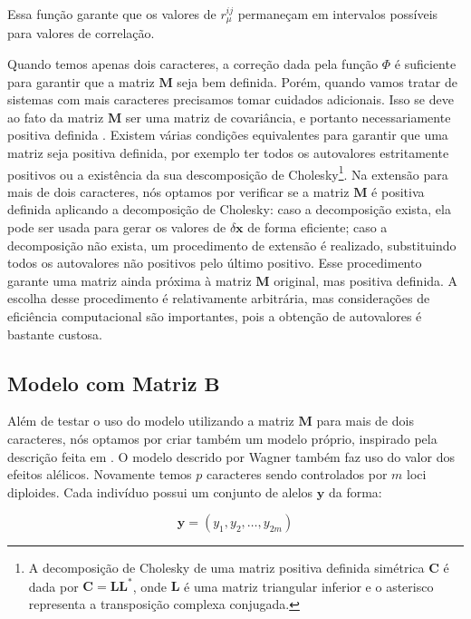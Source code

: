 Essa função garante que os valores de $r_\mu^{ij}$ permaneçam em
intervalos possíveis para valores de correlação.

Quando temos apenas dois caracteres, a correção dada pela função $\Phi$ é
suficiente para garantir que a matriz $\mathbf{M}$ seja bem definida.
Porém, quando vamos tratar de sistemas com mais caracteres precisamos
tomar cuidados adicionais.
Isso se deve ao fato da matriz $\mathbf{M}$ ser uma matriz de covariância, e
portanto necessariamente positiva definida \citep{Anderson1984}.
Existem várias condições equivalentes para garantir que uma matriz seja
positiva definida, por exemplo ter todos os autovalores estritamente
positivos ou a existência da sua descomposição de Cholesky\footnote{A
decomposição de Cholesky de uma matriz positiva definida simétrica
$\mathbf{C}$ é dada por $\mathbf{C}=\mathbf{LL}^*$, onde $\mathbf{L}$ é uma matriz triangular inferior e o asterisco
representa a transposição complexa conjugada.}.
Na extensão para mais de dois caracteres, nós optamos por verificar se a
matriz $\mathbf{M}$ é positiva definida aplicando a decomposição de Cholesky:
caso a decomposição exista, ela pode ser usada para gerar os valores
de $\delta \mathbf{x}$ de forma eficiente; caso a decomposição não exista, um
procedimento de extensão \citep{Marroig2011b} é realizado,
substituindo todos os autovalores não positivos pelo último positivo.
Esse procedimento garante uma matriz ainda próxima à matriz $\mathbf{M}$
original, mas positiva definida.
A escolha desse procedimento é relativamente arbitrária, mas
considerações de eficiência computacional são importantes, pois a
obtenção de autovalores é bastante custosa.

\subsection{Modelo com Matriz $\mathbf{B}$}\label{cap2:mem:ModelB}

Além de testar o uso do modelo utilizando a matriz $\mathbf{M}$ para mais de dois
caracteres, nós optamos por criar também um modelo próprio, inspirado pela
descrição feita em \cite{Wagner1984}.
O modelo descrido por Wagner também faz uso do valor dos efeitos
alélicos.
Novamente temos $p$ caracteres sendo controlados por $m$ loci diploides.
Cada indivíduo possui um conjunto de alelos $\mathbf{y}$ da forma:

\begin{equation}
    \mathbf{y} = (y_1, y_2, \ldots, y_{2m})
\end{equation}

